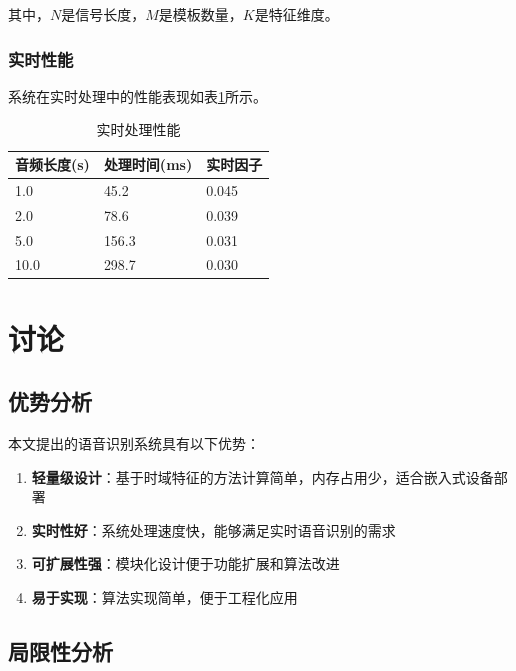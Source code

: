 \documentclass[sigconf,nonacm]{acmart}
\begin{document}
其中，$N$是信号长度，$M$是模板数量，$K$是特征维度。

\subsubsection{实时性能}

系统在实时处理中的性能表现如表\ref{tab:realtime_performance}所示。

\begin{table}[htbp]
\caption{实时处理性能}
\label{tab:realtime_performance}
\begin{center}
\begin{tabular}{|p{1.6cm}|p{1.8cm}|p{1.8cm}|}
\hline
\textbf{音频长度(s)} & \textbf{处理时间(ms)} & \textbf{实时因子} \\
\hline
1.0 & 45.2 & 0.045 \\
\hline
2.0 & 78.6 & 0.039 \\
\hline
5.0 & 156.3 & 0.031 \\
\hline
10.0 & 298.7 & 0.030 \\
\hline
\end{tabular}
\end{center}
\end{table}

\section{讨论}

\subsection{优势分析}

本文提出的语音识别系统具有以下优势：

\begin{enumerate}
\item \textbf{轻量级设计}：基于时域特征的方法计算简单，内存占用少，适合嵌入式设备部署
\item \textbf{实时性好}：系统处理速度快，能够满足实时语音识别的需求
\item \textbf{可扩展性强}：模块化设计便于功能扩展和算法改进
\item \textbf{易于实现}：算法实现简单，便于工程化应用
\end{enumerate}

\subsection{局限性分析}
\end{document}
